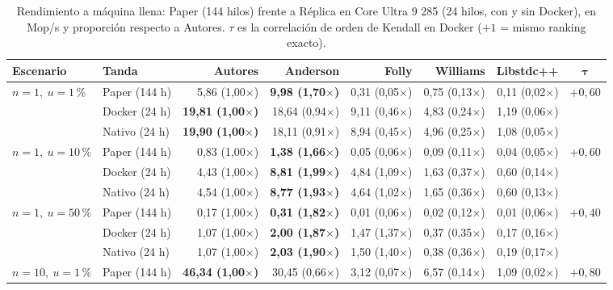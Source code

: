 \documentclass[11pt,a4paper]{article}
\begin{document}
\begin{table}[H]
\centering
\caption{Rendimiento a máquina llena: Paper (144 hilos) frente a Réplica en Core Ultra 9 285 (24 hilos, con y sin Docker), en Mop/s y proporción respecto a Autores. $\tau$ es la correlación de orden de Kendall en Docker ($+1$ = mismo ranking exacto).}
\label{tab:fig5_completa}
\scriptsize
\setlength{\tabcolsep}{3.5pt}
\begin{tabular}{@{}l l r r r r r c@{}}
\toprule
\textbf{Escenario} & \textbf{Tanda} & \textbf{Autores} & \textbf{Anderson} & \textbf{Folly} & \textbf{Williams} & \textbf{Libstdc++} & $\boldsymbol{\tau}$ \\
\midrule
\multirow{3}{*}{$n=1,\ u=1\,\%$}
  & Paper (144 h) & 5,86 (1,00$\times$) & \textbf{9,98 (1,70$\times$)} & 0,31 (0,05$\times$) & 0,75 (0,13$\times$) & 0,11 (0,02$\times$) & \multirow{3}{*}{$+0,60$} \\
  & Docker (24 h) & \textbf{19,81 (1,00$\times$)} & 18,64 (0,94$\times$) & 9,11 (0,46$\times$) & 4,83 (0,24$\times$) & 1,19 (0,06$\times$) & \\
  & Nativo (24 h) & \textbf{19,90 (1,00$\times$)} & 18,11 (0,91$\times$) & 8,94 (0,45$\times$) & 4,96 (0,25$\times$) & 1,08 (0,05$\times$) & \\
\midrule
\multirow{3}{*}{$n=1,\ u=10\,\%$}
  & Paper (144 h) & 0,83 (1,00$\times$) & \textbf{1,38 (1,66$\times$)} & 0,05 (0,06$\times$) & 0,09 (0,11$\times$) & 0,04 (0,05$\times$) & \multirow{3}{*}{$+0,60$} \\
  & Docker (24 h) & 4,43 (1,00$\times$) & \textbf{8,81 (1,99$\times$)} & 4,84 (1,09$\times$) & 1,63 (0,37$\times$) & 0,60 (0,14$\times$) & \\
  & Nativo (24 h) & 4,54 (1,00$\times$) & \textbf{8,77 (1,93$\times$)} & 4,64 (1,02$\times$) & 1,65 (0,36$\times$) & 0,60 (0,13$\times$) & \\
\midrule
\multirow{3}{*}{$n=1,\ u=50\,\%$}
  & Paper (144 h) & 0,17 (1,00$\times$) & \textbf{0,31 (1,82$\times$)} & 0,01 (0,06$\times$) & 0,02 (0,12$\times$) & 0,01 (0,06$\times$) & \multirow{3}{*}{$+0,40$} \\
  & Docker (24 h) & 1,07 (1,00$\times$) & \textbf{2,00 (1,87$\times$)} & 1,47 (1,37$\times$) & 0,37 (0,35$\times$) & 0,17 (0,16$\times$) & \\
  & Nativo (24 h) & 1,07 (1,00$\times$) & \textbf{2,03 (1,90$\times$)} & 1,50 (1,40$\times$) & 0,38 (0,36$\times$) & 0,19 (0,17$\times$) & \\
\midrule
\multirow{3}{*}{$n=10,\ u=1\,\%$}
  & Paper (144 h) & \textbf{46,34 (1,00$\times$)} & 30,45 (0,66$\times$) & 3,12 (0,07$\times$) & 6,57 (0,14$\times$) & 1,09 (0,02$\times$) & \multirow{3}{*}{$+0,80$} \\

\end{tabular}
\end{table}
\end{document}
